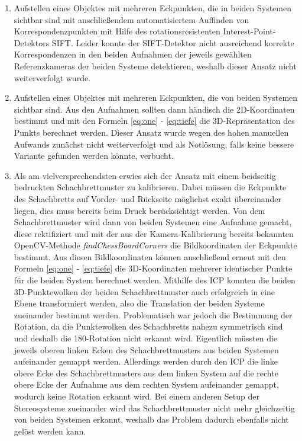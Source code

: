 \begin{enumerate}
	\item Aufstellen eines Objektes mit mehreren Eckpunkten, die in beiden Systemen sichtbar sind mit anschließendem automatisiertem Auffinden von Korrespondenzpunkten mit Hilfe des rotationsresistenten Interest-Point-Detektors SIFT. Leider konnte der SIFT-Detektor nicht ausreichend korrekte Korrespondenzen in den beiden Aufnahmen der jeweils gewählten Referenzkameras der beiden Systeme detektieren, weshalb dieser Ansatz nicht weiterverfolgt wurde.
	
	
	\item Aufstellen eines Objektes mit mehreren Eckpunkten, die von beiden Systemen sichtbar sind. Aus den Aufnahmen sollten dann händisch die 2D-Koordinaten bestimmt und mit den Formeln 
	\ref{eq:one} - \ref{eq:tiefe} die 3D-Repräsentation des Punkts berechnet werden. Dieser Ansatz wurde wegen des hohen manuellen Aufwands zunächst nicht weiterverfolgt und als Notlösung, falls keine bessere Variante gefunden werden könnte, verbucht. 
	
	\item Als am vielversprechendsten erwies sich der Ansatz mit einem beidseitig bedruckten Schachbrettmuster zu kalibrieren. Dabei müssen die Eckpunkte des Schachbretts auf Vorder- und Rückseite möglichst exakt übereinander liegen, dies muss bereits beim Druck berücksichtigt werden. Von dem Schachbrettmuster wird dann von beiden Systemen eine Aufnahme gemacht, diese rektifiziert und mit der aus der Kamera-Kalibrierung bereits bekannten OpenCV-Methode \textit{findChessBoardCorners} die Bildkoordinaten der Eckpunkte bestimmt. Aus diesen Bildkoordinaten können anschließend erneut mit den Formeln \ref{eq:one} - \ref{eq:tiefe} die 3D-Koordinaten mehrerer identischer Punkte für die beiden System berechnet werden. \newline 
	\noindent Mithilfe des ICP konnten die beiden 3D-Punktewolken der beiden Schachbrettmuster auch erfolgreich in eine Ebene transformiert werden, also die Translation der beiden Systeme zueinander bestimmt werden. Problematisch war jedoch die Bestimmung der Rotation, da die Punktewolken des Schachbretts nahezu symmetrisch sind und deshalb die 180\degree-Rotation nicht erkannt wird. Eigentlich müssten die jeweils oberen linken Ecken des Schachbrettmusters aus beiden Systemen aufeinander gemappt werden. Allerdings werden durch den ICP die linke obere Ecke des Schachbrettmusters aus dem linken System auf die rechte obere Ecke der Aufnahme aus dem rechten System aufeinander gemappt, wodurch keine Rotation erkannt wird. Bei einem anderen Setup der Stereosysteme zueinander wird das Schachbrettmuster nicht mehr gleichzeitig von beiden Systemen erkannt, weshalb das Problem dadurch ebenfalls nicht gelöst werden kann.
	
\end{enumerate}

